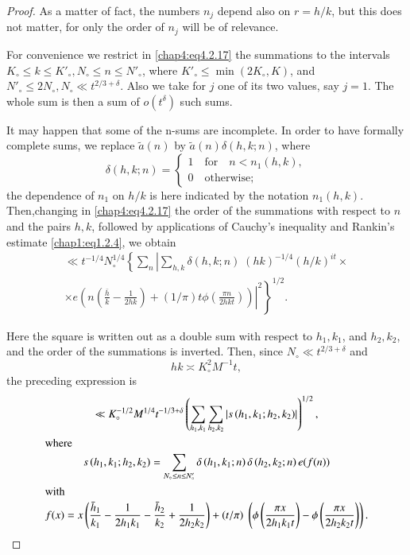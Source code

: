 \begin{proof}
As a matter of fact, the numbers $n_j$ depend also on $r=h/k$, but
this does not matter, for only the order of $n_j$ will be of
relevance. 

For convenience we restrict in \eqref{chap4:eq4.2.17} the summations
to the intervals $K_\circ\leq k\leq K'_{\circ}, N_\circ\leq n\leq
N'_\circ$, where $K'_\circ\leq\min(2K_\circ,K)$, and $N'_\circ\leq
2N_\circ,N_\circ\ll t^{2/3+\delta}$. Also we take for $j$ one of its
two values, say $j=1$. The whole sum is then a sum of $o(t^\delta)$
such sums. 

It may happen that some of the n-sums are incomplete. In order to have formally complete sums, we replace $\tilde{a}(n)$ by $\tilde{a}(n)\delta (h,k;n)$, where 
\begin{equation*}
\delta(h,k;n)=
\begin{cases}
1\quad\text{for}\quad n<n_1(h,k),\\
0\quad\text{otherwise};
\end{cases}
\end{equation*}
the dependence of $n_1$ on $h/k$ is here indicated by the notation $n_1(h,k)$. Then,\pageoriginale changing in \eqref{chap4:eq4.2.17} the order of the summations with respect to $n$ and the pairs $h,k$, followed by applications of Cauchy's inequality and Rankin's estimate \eqref{chap1:eq1.2.4}, we obtain
\begin{multline*}
\ll t^{-1/4}N_\circ^{1/4}\left\{\sum\limits_n\left|\sum\limits_{h,k}\delta (h,k;n)\;(hk)^{-1/4}(h/k)^{it}\times\right.\right.\\
\times \left.\left. e\left(n\left(\frac{\bar{h}}{k}-\frac{1}{2hk}\right)+ (1/\pi)t\phi\left(\frac{\pi n}{2hkt}\right)\right)\right|^2\right\}^{1/2}.
\end{multline*}

Here the square is written out as a double sum with respect to $h_1,k_1$, and $h_2,k_2$, and the order of the summations is inverted. Then, since $N_\circ\ll t^{2/3+\delta}$ and 
\begin{equation}\label{chap4:eq4.2.18}
hk\asymp K_\circ^2M^{-1}t,
\end{equation}
the preceding expression is 
{\fontsize{10}{12}\selectfont
\begin{gather}
 \ll K_\circ^{-1/2}M^{1/4}t^{-1/3+\delta}\left(\sum\limits_{h_1,k_1} \sum\limits_{h_2,k_2}\left|s\left(h_1,k_1;h_2,k_2\right)\right| \right)^{1/2},\label{chap4:eq4.2.19}\\
\intertext{where}
 s\left(h_1,k_1;h_2,k_2\right)=\sum\limits_{N_\circ\leq n\leq N'_\circ}\delta\left( h_1,k_1;n\right)\delta\left(h_2,k_2;n\right) e(f(n))\label{chap4:eq4.2.20}\\
\intertext{with}
 f(x)=x\left(\frac{\bar{h}_1}{k_1}-\frac{1}{2h_1k_1}-\frac{\bar{h}_2}{k_2}+ \frac{1}{2h_2k_2}\right)+(t/\pi)\;\left(\phi\left(\frac{\pi x}{2h_1k_1t} \right)-\phi\left(\frac{\pi x}{2h_2k_2t}\right) \right).\label{chap4:eq4.2.21}
\end{gather}}


\end{proof}
